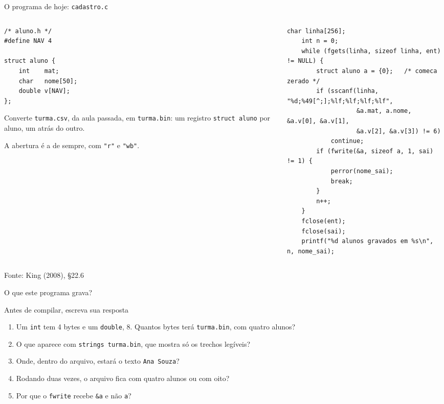 \documentclass[aspectratio=169]{beamer}
\newcommand{\fonte}[1]{\vfill\hfill{\scriptsize\textcolor{UFSGray}{Fonte: #1}}}
\begin{document}
\begin{frame}[fragile]{O programa de hoje: \texttt{cadastro.c}}
  \vspace{-0.8em}
  \begin{columns}[T]
    \begin{column}{0.36\textwidth}
\begin{lstlisting}[style=codCs]
/* aluno.h */
#define NAV 4

struct aluno {
    int    mat;
    char   nome[50];
    double v[NAV];
};
\end{lstlisting}
      \small Converte \texttt{turma.csv}, da aula passada, em
      \texttt{turma.bin}: um registro \texttt{struct aluno} por aluno, um
      atrás do outro.

      \medskip
      A abertura é a de sempre, com \texttt{"r"} e \texttt{"wb"}.
    \end{column}
    \begin{column}{0.62\textwidth}
\begin{lstlisting}[style=codCs]
    char linha[256];
    int n = 0;
    while (fgets(linha, sizeof linha, ent) != NULL) {
        struct aluno a = {0};   /* comeca zerado */
        if (sscanf(linha, "%d;%49[^;];%lf;%lf;%lf;%lf",
                   &a.mat, a.nome, &a.v[0], &a.v[1],
                   &a.v[2], &a.v[3]) != 6)
            continue;
        if (fwrite(&a, sizeof a, 1, sai) != 1) {
            perror(nome_sai);
            break;
        }
        n++;
    }
    fclose(ent);
    fclose(sai);
    printf("%d alunos gravados em %s\n", n, nome_sai);
\end{lstlisting}
    \end{column}
  \end{columns}
  \fonte{King (2008), §22.6~\cite{king2008c}}
\end{frame}

\begin{frame}{O que este programa grava?}
  \begin{block}{Antes de compilar, escreva sua resposta}
    \begin{enumerate}
      \item Um \texttt{int} tem 4 bytes e um \texttt{double}, 8. Quantos
        bytes terá \texttt{turma.bin}, com quatro alunos?
      \item O que aparece com \texttt{strings turma.bin}, que mostra só os
        trechos legíveis?
      \item Onde, dentro do arquivo, estará o texto \texttt{Ana Souza}?
      \item Rodando duas vezes, o arquivo fica com quatro alunos ou com oito?
      \item Por que o \texttt{fwrite} recebe \texttt{\&a} e não \texttt{a}?
    \end{enumerate}
  \end{block}
\end{frame}
\end{document}
